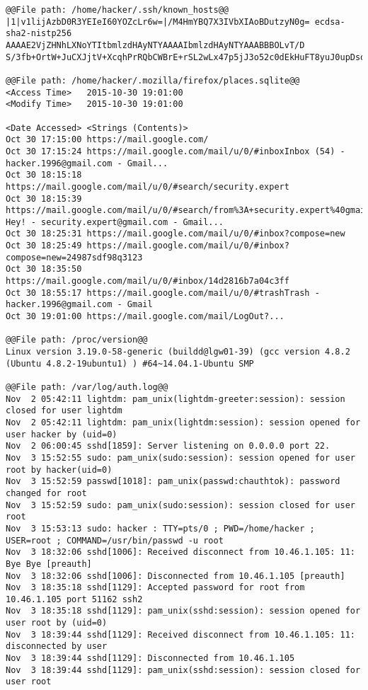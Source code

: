 \documentclass[addpoints]{exam}
\begin{document}
\begin{questions}
\begin{lstlisting}
@@File path: /home/hacker/.ssh/known_hosts@@
|1|v1lijAzbD0R3YEIeI60YOZcLr6w=|/M4HmYBQ7X3IVbXIAoBDutzyN0g= ecdsa-sha2-nistp256 AAAAE2VjZHNhLXNoYTItbmlzdHAyNTYAAAAIbmlzdHAyNTYAAABBBOLvT/D    S/3fb+OrtW+JuCXJjtV+XcqhPrRQbCWBrE+rSL2wLx47p5jJ3o52c0dEkHuFT8yuJ0upDsoKAFHs14iA=

@@File path: /home/hacker/.mozilla/firefox/places.sqlite@@
<Access Time>   2015-10-30 19:01:00
<Modify Time>   2015-10-30 19:01:00

<Date Accessed> <Strings (Contents)>   
Oct 30 17:15:00 https://mail.google.com/
Oct 30 17:15:24 https://mail.google.com/mail/u/0/#inboxInbox (54) - hacker.1996@gmail.com - Gmail...
Oct 30 18:15:18 https://mail.google.com/mail/u/0/#search/security.expert
Oct 30 18:15:39 https://mail.google.com/mail/u/0/#search/from%3A+security.expert%40gmail.com/14d2816b7a04c3ff Hey! - security.expert@gmail.com - Gmail...
Oct 30 18:25:31 https://mail.google.com/mail/u/0/#inbox?compose=new
Oct 30 18:25:49 https://mail.google.com/mail/u/0/#inbox?compose=new=24987sdf98q3123
Oct 30 18:35:50 https://mail.google.com/mail/u/0/#inbox/14d2816b7a04c3ff
Oct 30 18:55:17 https://mail.google.com/mail/u/0/#trashTrash - hacker.1996@gmail.com - Gmail
Oct 30 19:01:00 https://mail.google.com/mail/LogOut?...

@@File path: /proc/version@@
Linux version 3.19.0-58-generic (buildd@lgw01-39) (gcc version 4.8.2 (Ubuntu 4.8.2-19ubuntu1) ) #64~14.04.1-Ubuntu SMP 

@@File path: /var/log/auth.log@@
Nov  2 05:42:11 lightdm: pam_unix(lightdm-greeter:session): session closed for user lightdm
Nov  2 05:42:11 lightdm: pam_unix(lightdm:session): session opened for user hacker by (uid=0)
Nov  2 06:00:45 sshd[1859]: Server listening on 0.0.0.0 port 22.
Nov  3 15:52:55 sudo: pam_unix(sudo:session): session opened for user root by hacker(uid=0)
Nov  3 15:52:59 passwd[1018]: pam_unix(passwd:chauthtok): password changed for root
Nov  3 15:52:59 sudo: pam_unix(sudo:session): session closed for user root
Nov  3 15:53:13 sudo: hacker : TTY=pts/0 ; PWD=/home/hacker ; USER=root ; COMMAND=/usr/bin/passwd -u root
Nov  3 18:32:06 sshd[1006]: Received disconnect from 10.46.1.105: 11: Bye Bye [preauth]
Nov  3 18:32:06 sshd[1006]: Disconnected from 10.46.1.105 [preauth]
Nov  3 18:35:18 sshd[1129]: Accepted password for root from 10.46.1.105 port 51162 ssh2
Nov  3 18:35:18 sshd[1129]: pam_unix(sshd:session): session opened for user root by (uid=0)
Nov  3 18:39:44 sshd[1129]: Received disconnect from 10.46.1.105: 11: disconnected by user
Nov  3 18:39:44 sshd[1129]: Disconnected from 10.46.1.105
Nov  3 18:39:44 sshd[1129]: pam_unix(sshd:session): session closed for user root


\end{lstlisting}
\end{questions}
\end{document}
